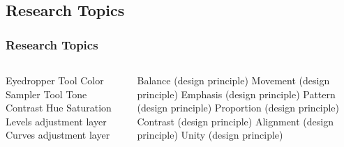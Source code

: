 \documentclass{beamer}
\begin{document}
			\subsection{Research Topics}		
				\begin{frame}
					\frametitle{Research Topics}
					\begin{columns}
						\begin{outline}
							\1 Eyedropper Tool
							\1 Color Sampler Tool
							\1 Tone
							\1 Contrast
							\1 Hue
							\1 Saturation
							\1 Levels adjustment layer
							\1 Curves adjustment layer
						\end{outline}
						\column{.5\textwidth}
					\begin{outline}
						\1 Balance (design principle)
						\1 Movement (design principle)
						\1 Emphasis (design principle)
						\1 Pattern (design principle)
						\1 Proportion (design principle)
						\1 Contrast (design principle)
						\1 Alignment (design principle)
						\1 Unity (design principle)
					\end{outline}
					\end{columns}
				\end{frame}
	
	\section{}	
\end{document}
